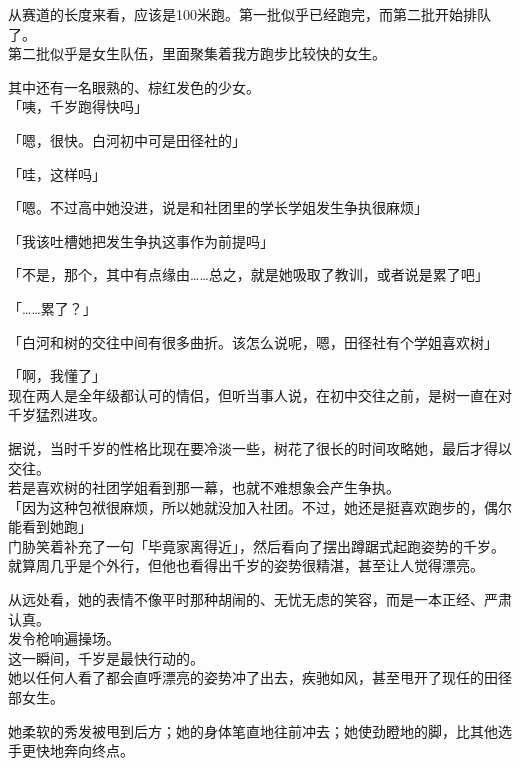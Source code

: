 从赛道的长度来看，应该是100米跑。第一批似乎已经跑完，而第二批开始排队了。\\

第二批似乎是女生队伍，里面聚集着我方跑步比较快的女生。

其中还有一名眼熟的、棕红发色的少女。\\

「咦，千岁跑得快吗」

「嗯，很快。白河初中可是田径社的」

「哇，这样吗」

「嗯。不过高中她没进，说是和社团里的学长学姐发生争执很麻烦」

「我该吐槽她把发生争执这事作为前提吗」

「不是，那个，其中有点缘由……总之，就是她吸取了教训，或者说是累了吧」

「……累了？」

「白河和树的交往中间有很多曲折。该怎么说呢，嗯，田径社有个学姐喜欢树」

「啊，我懂了」\\

现在两人是全年级都认可的情侣，但听当事人说，在初中交往之前，是树一直在对千岁猛烈进攻。

据说，当时千岁的性格比现在要冷淡一些，树花了很长的时间攻略她，最后才得以交往。\\

若是喜欢树的社团学姐看到那一幕，也就不难想象会产生争执。\\

「因为这种包袱很麻烦，所以她就没加入社团。不过，她还是挺喜欢跑步的，偶尔能看到她跑」\\

门胁笑着补充了一句「毕竟家离得近」，然后看向了摆出蹲踞式起跑姿势的千岁。\\

就算周几乎是个外行，但他也看得出千岁的姿势很精湛，甚至让人觉得漂亮。

从远处看，她的表情不像平时那种胡闹的、无忧无虑的笑容，而是一本正经、严肃认真。\\

发令枪响遍操场。\\

这一瞬间，千岁是最快行动的。\\

她以任何人看了都会直呼漂亮的姿势冲了出去，疾驰如风，甚至甩开了现任的田径部女生。

她柔软的秀发被甩到后方；她的身体笔直地往前冲去；她使劲瞪地的脚，比其他选手更快地奔向终点。\\

